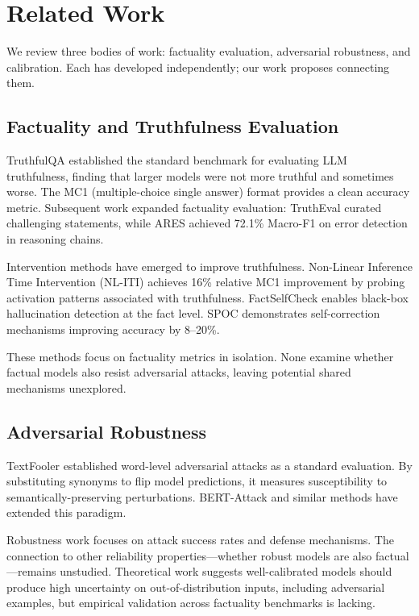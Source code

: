 \section{Related Work}

We review three bodies of work: factuality evaluation, adversarial robustness, and calibration. Each has developed independently; our work proposes connecting them.

\subsection{Factuality and Truthfulness Evaluation}

TruthfulQA \cite{lin2022truthfulqa} established the standard benchmark for evaluating LLM truthfulness, finding that larger models were not more truthful and sometimes worse. The MC1 (multiple-choice single answer) format provides a clean accuracy metric. Subsequent work expanded factuality evaluation: TruthEval \cite{khatun2024trutheval} curated challenging statements, while ARES \cite{you2025ares} achieved 72.1\% Macro-F1 on error detection in reasoning chains.

Intervention methods have emerged to improve truthfulness. Non-Linear Inference Time Intervention (NL-ITI) \cite{hoscilowicz2024nliti} achieves 16\% relative MC1 improvement by probing activation patterns associated with truthfulness. FactSelfCheck \cite{sawczyn2025factselfcheck} enables black-box hallucination detection at the fact level. SPOC \cite{zhao2025spoc} demonstrates self-correction mechanisms improving accuracy by 8--20\%.

These methods focus on factuality metrics in isolation. None examine whether factual models also resist adversarial attacks, leaving potential shared mechanisms unexplored.

\subsection{Adversarial Robustness}

TextFooler \cite{jin2019bert} established word-level adversarial attacks as a standard evaluation. By substituting synonyms to flip model predictions, it measures susceptibility to semantically-preserving perturbations. BERT-Attack and similar methods have extended this paradigm.

Robustness work focuses on attack success rates and defense mechanisms. The connection to other reliability properties---whether robust models are also factual---remains unstudied. Theoretical work suggests well-calibrated models should produce high uncertainty on out-of-distribution inputs, including adversarial examples, but empirical validation across factuality benchmarks is lacking.

